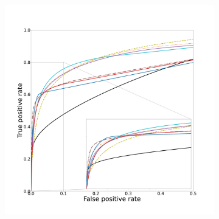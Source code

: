 \begin{figure}[!ht]
  \captionsetup[subfigure]{justification=centering}
  \centering
  \begin{subfigure}[t]{0.78\textwidth}
    \centering
  \includegraphics[width=\textwidth,clip = true, trim  =  125 125 180 200]{Images/Bullitt_ROC.pdf}
  \end{subfigure}
  \begin{subfigure}[t]{0.2\textwidth}

\end{subfigure}
\end{figure}
